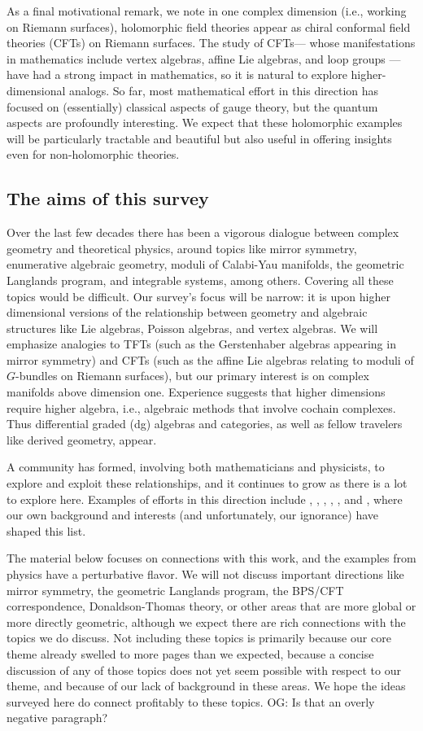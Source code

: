 \documentclass[11pt]{amsart}
\def\owen#1{{\textcolor{violet!50!black}{OG: {#1}}}}
\begin{document}
As a final motivational remark, we note in one complex dimension (i.e., working on Riemann surfaces), 
holomorphic field theories appear as chiral conformal field theories (CFTs) on Riemann surfaces. 
The study of CFTs--- whose manifestations in mathematics include vertex algebras, affine Lie algebras, and loop groups --- have had a strong impact in mathematics,
so it is natural to explore higher-dimensional analogs.
So far, most mathematical effort in this direction has focused on (essentially) classical aspects of gauge theory,
but the quantum aspects are profoundly interesting.
We expect that these holomorphic examples will be particularly tractable and beautiful but also useful in offering insights even for non-holomorphic theories.

\subsection{The aims of this survey}

Over the last few decades there has been a vigorous dialogue between complex geometry and theoretical physics,
around topics like mirror symmetry, enumerative algebraic geometry, moduli of Calabi-Yau manifolds, the geometric Langlands program, and integrable systems, among others.
Covering all these topics would be difficult.
Our survey's focus will be narrow:
it is upon higher dimensional versions of the relationship between geometry and algebraic structures like Lie algebras, Poisson algebras, and vertex algebras.
We will emphasize analogies to TFTs (such as the Gerstenhaber algebras appearing in mirror symmetry) and CFTs (such as the affine Lie algebras relating to moduli of $G$-bundles on Riemann surfaces),
but our primary interest is on complex manifolds above dimension one.
Experience suggests that higher dimensions require higher algebra,
i.e., algebraic methods that involve cochain complexes.
Thus differential graded (dg) algebras and categories,
as well as fellow travelers like derived geometry, appear.

A community has formed, involving both mathematicians and physicists, to explore and exploit these relationships,
and it continues to grow as there is a lot to explore here.
Examples of efforts in this direction include \cite{PTVV}, \cite{FHK}, \cite{Keviny things}, \cite{GaiottoEtAl}, \cite{Paquette}, and \cite{BBBDN}, 
where our own background and interests (and unfortunately, our ignorance) have shaped this list.

The material below focuses on connections with this work,
and the examples from physics have a perturbative flavor.
We will not discuss important directions like mirror symmetry, the geometric Langlands program, the BPS/CFT correspondence, Donaldson-Thomas theory, or other areas that are more global or more directly geometric,
although we expect there are rich connections with the topics we do discuss.
Not including these topics is primarily because our core theme already swelled to more pages than we expected, 
because a concise discussion of any of those topics does not yet seem possible with respect to our theme,
and because of our lack of background in these areas.
We hope the ideas surveyed here do connect profitably to these topics.
\owen{Is that an overly negative paragraph?}
\end{document}
